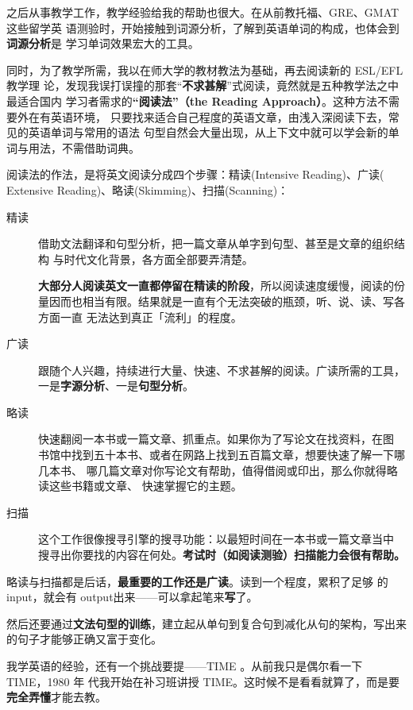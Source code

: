 之后从事教学工作，教学经验给我的帮助也很大。在从前教托福、GRE、GMAT这些留学英
语测验时，开始接触到词源分析，了解到英语单词的构成，也体会到\textbf{词源分析}是
学习单词效果宏大的工具。

同时，为了教学所需，我以在师大学的教材教法为基础，再去阅读新的 ESL/EFL教学理
论，发现我误打误撞的那套“\textbf{不求甚解}”式阅读，竟然就是五种教学法之中最适合国内
学习者需求的\textbf{“阅读法”（the Reading Approach）}。这种方法不需要外在有英语环境，
只要找来适合自己程度的英语文章，由浅入深阅读下去，常见的英语单词与常用的语法
句型自然会大量出现，从上下文中就可以学会新的单词与用法，不需借助词典。

阅读法的作法，是将英文阅读分成四个步骤：精读(Intensive Reading)、广读(
Extensive Reading)、略读(Skimming)、扫描(Scanning)：
\begin{description}
\item[精读] 借助文法翻译和句型分析，把一篇文章从单字到句型、甚至是文章的组织结构
  与时代文化背景，各方面全部要弄清楚。

  \textbf{大部分人阅读英文一直都停留在精读的阶段}，所以阅读速度缓慢，阅读的份
  量因而也相当有限。结果就是一直有个无法突破的瓶颈，听、说、读、写各方面一直
  无法达到真正「流利」的程度。

\item[广读] 跟随个人兴趣，持续进行大量、快速、不求甚解的阅读。广读所需的工具，
  一是\textbf{字源分析}、一是\textbf{句型分析}。

\item[略读] 快速翻阅一本书或一篇文章、抓重点。如果你为了写论文在找资料，在图
  书馆中找到五十本书、或者在网路上找到五百篇文章，想要快速了解一下哪几本书、
  哪几篇文章对你写论文有帮助，值得借阅或印出，那么你就得略读这些书籍或文章、
  快速掌握它的主题。

\item[扫描] 这个工作很像搜寻引擎的搜寻功能：以最短时间在一本书或一篇文章当中
  搜寻出你要找的内容在何处。\textbf{考试时（如阅读测验）扫描能力会很有帮助。}
\end{description}

略读与扫描都是后话，\textbf{最重要的工作还是广读}。读到一个程度，累积了足够
的 input，就会有 output出来——可以拿起笔来\textbf{写}了。

然后还要通过\textbf{文法句型的训练}，建立起从单句到复合句到减化从句的架构，写出来
的句子才能够正确又富于变化。

我学英语的经验，还有一个挑战要提——TIME 。从前我只是偶尔看一下 TIME，1980 年
代我开始在补习班讲授 TIME。这时候不是看看就算了，而是要\textbf{完全弄懂}才能去教。

